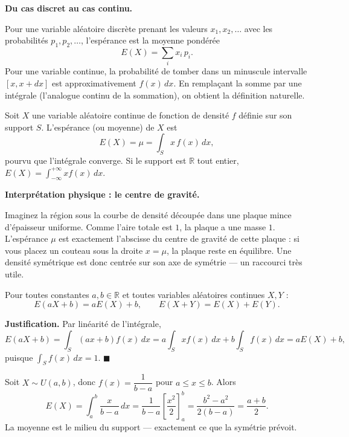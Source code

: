 \documentclass[11pt]{article}
\newcommand{\cle}[1]{{\popxbold\color{popdark}#1}}
\newcounter{popsec}
\newcounter{popsub}
\newcommand{\courssub}[1]{%
  \stepcounter{popsub}%
  \par\vspace{9pt}\noindent{\popxbold\fontsize{11.5}{13}\selectfont\color{popink}{\color{poporange}\thepopsec.\thepopsub}\hspace{6pt}#1}\par\nopagebreak\vspace{4pt}
}
\begin{document}
\courssub{L'espérance $E(X)$}

\textbf{Du cas discret au cas continu.}\par
Pour une variable aléatoire discrète prenant les valeurs $x_1,x_2,\dots$ avec les probabilités $p_1,p_2,\dots$, l'espérance est la moyenne pondérée
\[ E(X)=\sum_i x_i\,p_i . \]
Pour une variable continue, la probabilité de tomber dans un minuscule intervalle $[x,x+dx]$ est approximativement $f(x)\,dx$. En remplaçant la somme par une intégrale (l'analogue continu de la sommation), on obtient la définition naturelle.

\begin{definition}
Soit $X$ une variable aléatoire continue de fonction de densité $f$ définie sur son support $S$. L'\cle{espérance} (ou \cle{moyenne}) de $X$ est
\[ E(X)=\mu=\int_{S} x\,f(x)\,dx , \]
pourvu que l'intégrale converge. Si le support est $\mathbb{R}$ tout entier, $E(X)=\displaystyle\int_{-\infty}^{+\infty} x f(x)\,dx$.
\end{definition}

\textbf{Interprétation physique : le centre de gravité.}\par
Imaginez la région sous la courbe de densité découpée dans une plaque mince d'épaisseur uniforme. Comme l'aire totale est $1$, la plaque a une masse $1$. L'espérance $\mu$ est exactement l'abscisse du \cle{centre de gravité} de cette plaque : si vous placez un couteau sous la droite $x=\mu$, la plaque reste en équilibre. Une densité symétrique est donc centrée sur son axe de symétrie — un raccourci très utile.

\begin{propriete}
Pour toutes constantes $a,b\in\mathbb{R}$ et toutes variables aléatoires continues $X,Y$ :
\[ E(aX+b)=aE(X)+b, \qquad E(X+Y)=E(X)+E(Y). \]
\end{propriete}

\textbf{Justification.} Par linéarité de l'intégrale,
\[ E(aX+b)=\int_S (ax+b)f(x)\,dx = a\int_S x f(x)\,dx + b\int_S f(x)\,dx = aE(X)+b, \]
puisque $\int_S f(x)\,dx=1$. $\blacksquare$

\begin{exemplebox}
Soit $X\sim U(a,b)$, donc $f(x)=\dfrac{1}{b-a}$ pour $a\le x\le b$. Alors
\[ E(X)=\int_a^b \frac{x}{b-a}\,dx=\frac{1}{b-a}\left[\frac{x^2}{2}\right]_a^b=\frac{b^2-a^2}{2(b-a)}=\frac{a+b}{2}. \]
La moyenne est le milieu du support — exactement ce que la symétrie prévoit.
\end{exemplebox}
\end{document}
